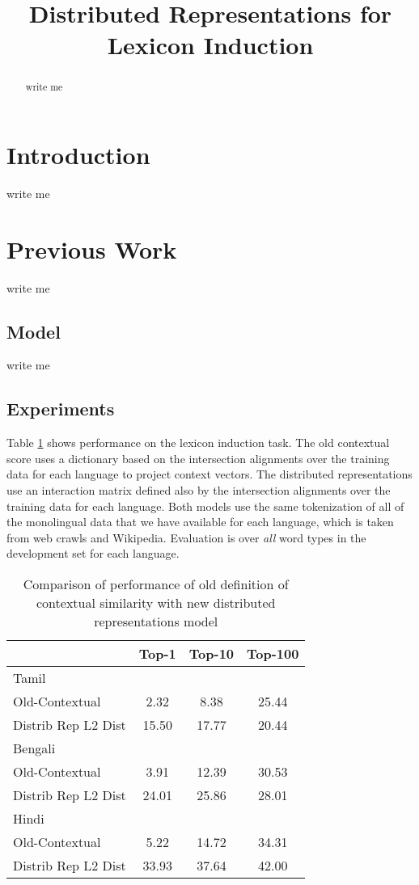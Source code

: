 \documentclass[11pt,letterpaper]{article}
\title{Distributed Representations for Lexicon Induction}
\date{}
\begin{document}
\maketitle
\begin{abstract}
write me
\end{abstract}

\section{Introduction}
write me

\section{Previous Work}
write me

\subsection{Model}
write me

\subsection{Experiments}

Table \ref{accresults} shows performance on the lexicon induction task. 
The old contextual score uses a dictionary based on the intersection alignments over the training data for each language to project context vectors.
The distributed representations use an interaction matrix defined also by the intersection alignments over the training data for each language.
Both models use the same tokenization of all of the monolingual data that we have available for each language, which is taken from web crawls and Wikipedia.
Evaluation is over {\it all} word types in the development set  for each language.


\begin{table}
\begin{center}
\begin{tabular}{|l|c|c|c|}
\hline
& Top-1 & Top-10 & Top-100 \\
\hline
\multicolumn{4}{|l|}{Tamil}  \\
\hline
Old-Contextual & 2.32 & 8.38 & 25.44 \\ 
Distrib Rep L2 Dist & 15.50 & 17.77 & 20.44 \\
\hline
\multicolumn{4}{|l|}{Bengali}  \\
\hline
Old-Contextual & 3.91 & 12.39 & 30.53 \\
Distrib Rep L2 Dist & 24.01 & 25.86 & 28.01 \\
\hline
\multicolumn{4}{|l|}{Hindi}  \\
\hline
Old-Contextual & 5.22 & 14.72 & 34.31 \\
Distrib Rep L2 Dist & 33.93 & 37.64 & 42.00 \\
\hline
\end{tabular}
\end{center}
\caption{Comparison of performance of old definition of contextual similarity with new distributed representations model}\label{accresults}
\end{table}
\end{document}
